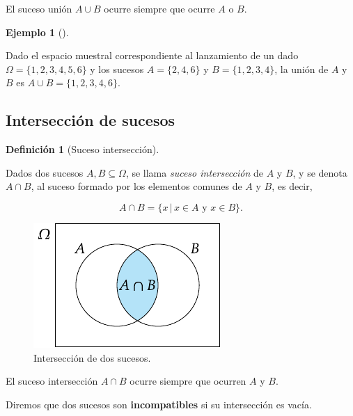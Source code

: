 \documentclass[
  a4paper,
]{scrreport}
\theoremstyle{plain}
\theoremstyle{definition}
\newtheorem{example}{Ejemplo}[chapter]
\theoremstyle{definition}
\newtheorem{definition}{Definición}[chapter]
\theoremstyle{remark}
\begin{document}
El suceso unión \(A\cup B\) ocurre siempre que ocurre \(A\) {o} \(B\).

\begin{example}[]\protect\hypertarget{exm-union-sucesos}{}\label{exm-union-sucesos}

Dado el espacio muestral correspondiente al lanzamiento de un dado
\(\Omega=\{1,2,3,4,5,6\}\) y los sucesos \(A=\{2,4,6\}\) y
\(B=\{1,2,3,4\}\), la unión de \(A\) y \(B\) es
\(A\cup B=\{1,2,3,4,6\}\).

\end{example}

\subsection{Intersección de sucesos}\label{intersecciuxf3n-de-sucesos}

\begin{definition}[Suceso
intersección]\protect\hypertarget{def-interseccion-sucesos}{}\label{def-interseccion-sucesos}

Dados dos sucesos \(A,B\subseteq \Omega\), se llama \emph{suceso
intersección} de \(A\) y \(B\), y se denota \(A\cap B\), al suceso
formado por los elementos comunes de \(A\) y \(B\), es decir,

\[A\cap B = \{x\,|\, x\in A\mbox{ y }x\in B\}.\]

\end{definition}

\begin{figure}[H]

{\centering \includegraphics{img/probabilidad/interseccion.pdf}

}

\caption{Intersección de dos sucesos.}

\end{figure}%

El suceso intersección \(A\cap B\) ocurre siempre que ocurren \(A\) {y}
\(B\).

Diremos que dos sucesos son \textbf{incompatibles} si su intersección es
vacía.
\end{document}
